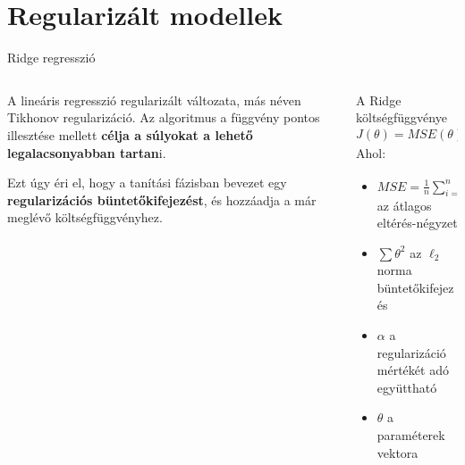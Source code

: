 \documentclass[english, aspectratio=169]{beamer}
\makeatletter
\let\origtableofcontents=\tableofcontents
\def\tableofcontents{\@ifnextchar[{\origtableofcontents}{\gobbletableofcontents}}
\def\gobbletableofcontents#1{\origtableofcontents}
\makeatother
\begin{document}
\section{Regularizált modellek}

\begin{frame}
\tableofcontents[currentsection]
\end{frame}

\begin{frame}{Ridge regresszió}
\begin{columns}
\begin{column}{.5\textwidth}
A lineáris regresszió regularizált változata, más néven Tikhonov regularizáció. Az algoritmus a függvény pontos illesztése mellett \textbf{célja a súlyokat a lehető legalacsonyabban tartan}i.\par\medskip
Ezt úgy éri el, hogy a tanítási fázisban bevezet egy \textbf{regularizációs büntetőkifejezést}, és hozzáadja a már meglévő költségfüggvényhez.
\end{column}
\begin{column}{.5\textwidth}
\begin{block}{A Ridge költségfüggvénye}
\[
J\left( \theta \right) = MSE\left( \theta \right) + \alpha \sum \theta^2
\]
Ahol: 
\begin{itemize}
	\item $MSE=\frac{1}{n} \sum_{i=1}^n \left( y_i - \hat{y}_i \right)^2$ az átlagos eltérés-négyzet
	\item $\sum \theta^2$ az $\ell_2$ norma büntetőkifejezés
	\item $\alpha$ a regularizáció mértékét adó együttható
	\item $\theta$ a paraméterek vektora
\end{itemize}
\end{block}
\end{column}
\end{columns}
\end{frame}
\end{document}
